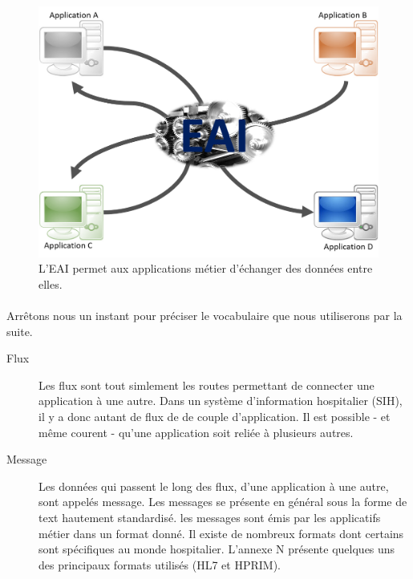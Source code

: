 			\begin{figure}
				\begin{center} \includegraphics[scale=0.2]{../img/EAI_1.png} \end{center}
				\caption{L'EAI permet aux applications métier d'échanger des données entre
				elles.}
			\end{figure}

			\paragraph{}%
 			Arrêtons nous un instant pour préciser le vocabulaire que nous utiliserons
 			par la suite.\newline
 			\begin{description}
 				\item[Flux] Les flux sont tout simlement les routes permettant de connecter
 				une application à une autre. Dans un système d'information hospitalier
 				(SIH), il y a donc autant de flux de de couple d'application. Il est
 				possible - et même courent - qu'une application soit reliée à plusieurs
 				autres.
 				\item[Message] Les données qui passent le long des flux, d'une application
 				à une autre, sont appelés message. Les messages se présente en général sous
 				la forme de text hautement standardisé. les messages sont émis par les
 				applicatifs métier dans un format donné. Il existe de nombreux formats
 				dont certains sont spécifiques au monde hospitalier. L'annexe N présente
 				quelques uns des principaux formats utilisés (HL7 et HPRIM).
 			\end{description}
 			

